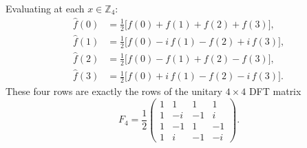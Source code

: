 \documentclass[11pt,a4paper]{article}
\newcommand{\Z}{\mathbb{Z}}
\begin{document}
Evaluating at each $x\in\Z_4$:
\[
\begin{aligned}
\widehat{f}(0)&=\tfrac{1}{2}\bigl[f(0)+f(1)+f(2)+f(3)\bigr],\\
\widehat{f}(1)&=\tfrac{1}{2}\bigl[f(0)-i\,f(1)-f(2)+i\,f(3)\bigr],\\
\widehat{f}(2)&=\tfrac{1}{2}\bigl[f(0)-f(1)+f(2)-f(3)\bigr],\\
\widehat{f}(3)&=\tfrac{1}{2}\bigl[f(0)+i\,f(1)-f(2)-i\,f(3)\bigr].
\end{aligned}
\]
These four rows are exactly the rows of the unitary $4\times 4$ DFT matrix
\[
F_{4}=\frac{1}{2}\begin{pmatrix}1 & 1 & 1 & 1\\ 1 & -i & -1 & i\\ 1 & -1 & 1 & -1\\ 1 & i & -1 & -i\end{pmatrix}.
\]
\end{document}
